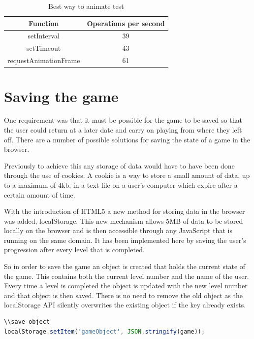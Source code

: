 \documentclass[12pt,a4paper]{report}
\begin{document}
\begin{table}[ht]
\centering
\begin{adjustbox}{width=1\textwidth}
\small
\begin{tabular}{ c | c }
  \hline
 Function & Operations per second \\ \hline 
    setInterval & 39 \\
    setTimeout & 43 \\
    requestAnimationFrame & 61 \\
   \hline
\end{tabular}
\end{adjustbox}
\caption{Best way to animate test} 
\end{table} 

\section{Saving the game}
One requirement was that it must be possible for the game to be saved so that the user could return at a later date and carry on playing from where they left off. There are a number of possible solutions for saving the state of a game in the browser.

Previously to achieve this any storage of data would have to have been done through the use of cookies. A cookie is a way to store a small amount of data, up to a maximum of 4kb, in a text file on a user's computer which expire after a certain amount of time.

With the introduction of HTML5 a new method for storing data in the browser was added, localStorage. This new mechanism allows 5MB of data to be stored locally on the browser and is then accessible through any JavaScript that is running on the same domain. It has been implemented here by saving the user's progression after every level that is completed.

So in order to save the game an object is created that holds the current state of the game. This contains both the current level number and the name of the user. Every time a level is completed the object is updated with the new level number and that object is then saved. There is no need to remove the old object as the localStorage API silently overwrites the existing object if the key already exists.


\begin{lstlisting}[language=JavaScript]
\\save object
localStorage.setItem('gameObject', JSON.stringify(game));
\end{lstlisting}
\end{document}
